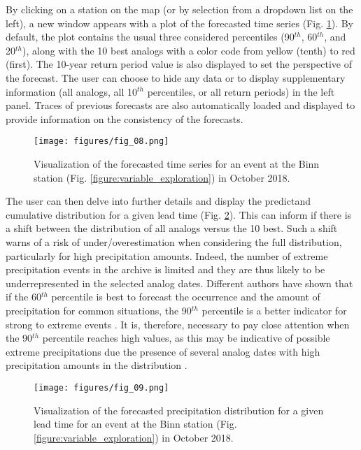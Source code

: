 \documentclass[review]{elsarticle}
\begin{document}
By clicking on a station on the map (or by selection from a dropdown list on the left), a new window appears with a plot of the forecasted time series (Fig. \ref{figure:atmoswing-viewer-timeseries}). By default, the plot contains the usual three considered percentiles (90$^{th}$, 60$^{th}$, and 20$^{th}$), along with the 10 best analogs with a color code from yellow (tenth) to red (first). The 10-year return period value is also displayed to set the perspective of the forecast. The user can choose to hide any data or to display supplementary information (all analogs, all 10$^{th}$ percentiles, or all return periods) in the left panel. Traces of previous forecasts are also automatically loaded and displayed to provide information on the consistency of the forecasts. 

\begin{figure}[hbt!]
	\texttt{[image: figures/fig\_08.png]}
	\caption{Visualization of the forecasted time series for an event at the Binn station (Fig. \ref{figure:variable_exploration}) in October 2018.}
	\label{figure:atmoswing-viewer-timeseries}
\end{figure}

The user can then delve into further details and display the predictand cumulative distribution for a given lead time (Fig. \ref{figure:atmoswing-viewer-distribution}). This can inform if there is a shift between the distribution of all analogs versus the 10 best. Such a shift warns of a risk of under/overestimation when considering the full distribution, particularly for high precipitation amounts. Indeed, the number of extreme precipitation events in the archive is limited and they are thus likely to be underrepresented in the selected analog dates. Different authors have shown that if the 60$^{th}$ percentile is best to forecast the occurrence and the amount of precipitation for common situations, the 90$^{th}$ percentile is a better indicator for strong to extreme events \citep{Djerboua2001, Bontron2004, Marty2010}. It is, therefore, necessary to pay close attention when the 90$^{th}$ percentile reaches high values, as this may be indicative of possible extreme precipitations due the presence of several analog dates with high precipitation amounts in the distribution \citep{Djerboua2001}.

\begin{figure}[hbt!]
	\texttt{[image: figures/fig\_09.png]}
	\caption{Visualization of the forecasted precipitation distribution for a given lead time for an event at the Binn station (Fig. \ref{figure:variable_exploration}) in October 2018.}
	\label{figure:atmoswing-viewer-distribution}
\end{figure}
\end{document}
